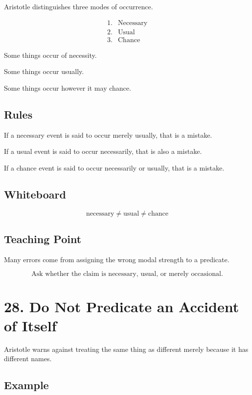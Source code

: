 \documentclass[12pt]{article}
\begin{document}
Aristotle distinguishes three modes of occurrence.

\[
\begin{array}{ll}
1. & \text{Necessary} \\
2. & \text{Usual} \\
3. & \text{Chance}
\end{array}
\]

Some things occur of necessity.

Some things occur usually.

Some things occur however it may chance.

\subsection*{Rules}

If a necessary event is said to occur merely usually, that is a mistake.

If a usual event is said to occur necessarily, that is also a mistake.

If a chance event is said to occur necessarily or usually, that is a mistake.

\subsection*{Whiteboard}

\[
\text{necessary} \neq \text{usual} \neq \text{chance}
\]

\subsection*{Teaching Point}

Many errors come from assigning the wrong modal strength to a predicate.

\[
\boxed{
\text{Ask whether the claim is necessary, usual, or merely occasional.}
}
\]

\section*{28. Do Not Predicate an Accident of Itself}

Aristotle warns against treating the same thing as different merely because it
has different names.

\subsection*{Example}
\end{document}
